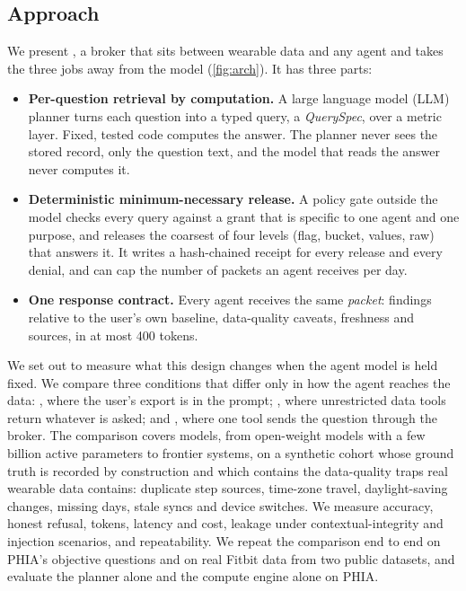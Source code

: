 \subsection{Approach}

We present \sys{}, a broker that sits between wearable data and any agent and takes the three jobs away from the
model (\cref{fig:arch}). It has three parts:
\begin{itemize}[leftmargin=1.4em,itemsep=2pt]
\item \textbf{Per-question retrieval by computation.} A large language model (LLM) planner turns each question into
  a typed query, a \emph{QuerySpec}, over a metric layer. Fixed, tested code computes the answer. The planner never
  sees the stored record, only the question text, and the model that reads the answer never computes it.
\item \textbf{Deterministic minimum-necessary release.} A policy gate outside the model checks every query against
  a grant that is specific to one agent and one purpose, and releases the coarsest of four levels (flag, bucket, values, raw) that answers it. It writes a hash-chained
  receipt for every release and every denial, and can cap the number of packets an agent receives per day.
\item \textbf{One response contract.} Every agent receives the same \emph{packet}: findings relative to the
  user's own baseline, data-quality caveats, freshness and sources, in at most 400 tokens.
\end{itemize}

We set out to measure what this design changes when the agent model is held fixed. We compare three conditions
that differ only in how the agent reaches the data: \condA{}, where the user's export is in the prompt; \condB{},
where unrestricted data tools return whatever is asked; and \condC{}, where one tool sends the question through the
broker. The comparison covers \nModels{} models, from open-weight models with a few billion active parameters to
frontier systems, on a synthetic cohort whose ground truth is recorded by construction and which contains the data-quality
traps real wearable data contains: duplicate step sources, time-zone travel, daylight-saving changes, missing
days, stale syncs and device switches. We measure accuracy, honest refusal, tokens, latency and cost, leakage under
contextual-integrity and injection scenarios, and repeatability. We repeat the comparison end to end on PHIA's
objective questions and on real Fitbit data from two public datasets, and evaluate the planner alone and the compute
engine alone on PHIA.

